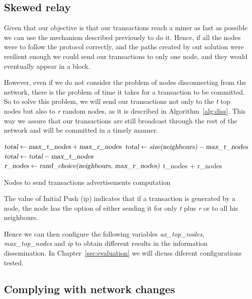 \documentclass{dads}   %
\begin{document}
\subsection{Skewed relay}
\label{sec:sr}
Given that our objective is that our transactions reach a miner as fast as possible we can use the mechanism described previously to do it. Hence, if all the nodes were to follow the protocol correctly, and the paths created by out solution were resilient enough we could send our transactions to only one node, and they would eventually appear in a block.

However, even if we do not consider the problem of nodes disconnecting from the network, there is the problem of time it takes for a transaction to be committed. So to solve this problem, we will send our transactions not only to the \textit{t} top nodes but also to \textit{r} random nodes, as it is described in Algorithm~\ref{alg:diss}. This way we assure that our transactions are still broadcast through the rest of the network and will be committed in a timely manner.

\begin{algorithm}[t]
\begin{algorithmic}[1]
\EndIf
\State $\textsl{total} \gets \textsl{max\_t\_nodes} + \textsl{max\_r\_nodes}$
	\State $\textsl{total} \gets \textsl{size(neighbours)} - \textsl{max\_t\_nodes}$
\Else
	\State $\textsl{total} \gets \textsl{total} - \textsl{max\_t\_nodes}$
    \EndIf
{}
	\State $\textsl{r\_nodes} \gets \textsl{rand\_choice(neighbours, max\_r\_nodes)}$
    \EndIf
\State \Return t\_nodes + r\_nodes
\EndFunction
\end{algorithmic}
\caption{Nodes to send transactions advertisements computation}
\label{alg:diss}
\end{algorithm}

The value of Initial Push (ip) indicates that if a transaction is generated by a node, the node has the option of either sending it for only \textit{t} plus \textit{r} or to all his neighbours.

Hence we can then configure the following variables \textsl{ax\_top\_nodes}, \textsl{max\_top\_nodes} and \textsl{ip} to obtain different results in the information dissemination. In Chapter~\ref{sec:evaluation} we will dicuss diferent configurations tested.

\subsection{Complying with network changes}
\label{sec:nc}
\end{document}

